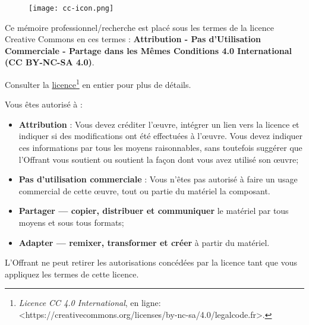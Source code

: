         \begin{figure}[H]
            \centering
            \texttt{[image: cc-icon.png]}
            \label{traitement}
        \end{figure}

    Ce mémoire professionnel/recherche est placé sous les termes de la licence Creative Commons en ces termes : \textbf{Attribution - Pas d'Utilisation Commerciale - Partage dans les Mêmes Conditions 4.0 International (CC BY-NC-SA 4.0)}.
\bigskip

    Consulter la \href{https://creativecommons.org/licenses/by-nc-sa/4.0/legalcode.fr}{licence\footnote{%
\textit{Licence CC 4.0 International}, en ligne: <\url{https://creativecommons.org/licenses/by-nc-sa/4.0/legalcode.fr}>.}} en entier pour plus de détails. 
\bigskip

    Vous êtes autorisé à :
    \begin{itemize}
        \item \textbf{Attribution} : Vous devez créditer l'\oe uvre, intégrer un lien vers la licence et indiquer si des modifications ont été effectuées à l'\oe uvre. Vous devez indiquer ces informations par tous les moyens raisonnables, sans toutefois suggérer que l'Offrant vous soutient ou soutient la façon dont vous avez utilisé son \oe uvre;
        \item \textbf{Pas d'utilisation commerciale} : Vous n'êtes pas autorisé à faire un usage commercial de cette \oe uvre, tout ou partie du matériel la composant. 
        \item \textbf{Partager — copier, distribuer et communiquer} le matériel par tous moyens et sous tous formats;
        \item \textbf{Adapter — remixer, transformer et créer} à partir du matériel.
    \end{itemize}
\bigskip

L'Offrant ne peut retirer les autorisations concédées par la licence tant que vous appliquez les termes de cette licence.

